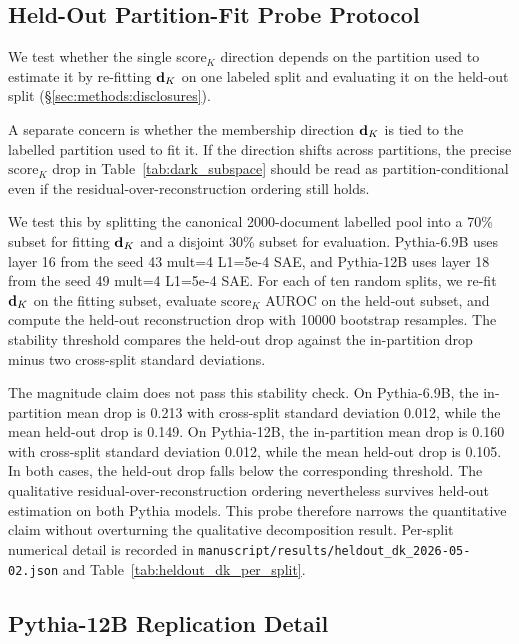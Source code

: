 \subsection{Held-Out Partition-Fit Probe Protocol}
\label{app:heldout_dk_protocol}

We test whether the single score$_K$ direction depends on the partition used to estimate it by re-fitting $\mathbf{d}_K$ on one labeled split and evaluating it on the held-out split (\S\ref{sec:methods:disclosures}).

A separate concern is whether the membership direction $\mathbf{d}_K$ is tied to the labelled partition used to fit it. If the direction shifts across partitions, the precise $\mathrm{score}_K$ drop in Table~\ref{tab:dark_subspace} should be read as partition-conditional even if the residual-over-reconstruction ordering still holds.

We test this by splitting the canonical 2000-document labelled pool into a 70\% subset for fitting $\mathbf{d}_K$ and a disjoint 30\% subset for evaluation. Pythia-6.9B uses layer 16 from the seed 43 mult=4 L1=5e-4 SAE, and Pythia-12B uses layer 18 from the seed 49 mult=4 L1=5e-4 SAE. For each of ten random splits, we re-fit $\mathbf{d}_K$ on the fitting subset, evaluate $\mathrm{score}_K$ AUROC on the held-out subset, and compute the held-out reconstruction drop with 10000 bootstrap resamples. The stability threshold compares the held-out drop against the in-partition drop minus two cross-split standard deviations.

The magnitude claim does not pass this stability check. On Pythia-6.9B, the in-partition mean drop is 0.213 with cross-split standard deviation 0.012, while the mean held-out drop is 0.149. On Pythia-12B, the in-partition mean drop is 0.160 with cross-split standard deviation 0.012, while the mean held-out drop is 0.105. In both cases, the held-out drop falls below the corresponding threshold. The qualitative residual-over-reconstruction ordering nevertheless survives held-out estimation on both Pythia models. This probe therefore narrows the quantitative claim without overturning the qualitative decomposition result. Per-split numerical detail is recorded in \texttt{manuscript/\allowbreak{}results/\allowbreak{}heldout\_\allowbreak{}dk\_\allowbreak{}2026-\allowbreak{}05-\allowbreak{}02.json} and Table~\ref{tab:heldout_dk_per_split}.

\subsection{Pythia-12B Replication Detail}
\label{app:p12b_replication}

